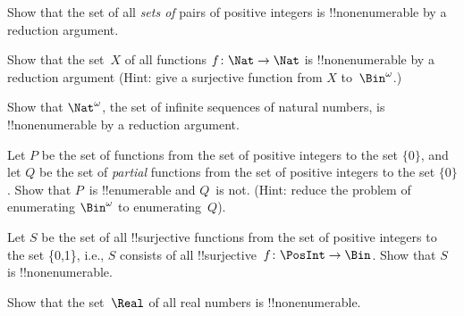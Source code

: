 \documentclass[../../../include/open-logic-section]{subfiles}
\begin{document}
\begin{prob}
Show that the set of all \emph{sets of} pairs of positive integers is
!!{nonenumerable} by a reduction argument.
\end{prob}

\begin{prob}\label{sfr:siz:red:prob:nat-nat}
  Show that the set~$X$ of all functions $f\colon \Nat \to \Nat$ is
  !!{nonenumerable} by a reduction argument (Hint: give a surjective
  function from $X$ to~$\Bin^\omega$.)
\end{prob}

\begin{prob}
Show that $\Nat^\omega$, the set of infinite sequences of
natural numbers, is !!{nonenumerable} by a reduction argument.
\end{prob}

\begin{prob}
Let $P$ be the set of functions from the set of positive
integers to the set $\{0\}$, and let $Q$ be the set of \emph{partial}
functions from the set of positive integers to the set $\{0\}$. Show
that $P$~is !!{enumerable} and $Q$~is not. (Hint: reduce the problem
of enumerating $\Bin^\omega$ to enumerating~$Q$).
\end{prob}

\begin{prob}
Let $S$ be the set of all !!{surjective} functions from the set of
positive integers to the set \{0,1\}, i.e., $S$ consists of all
!!{surjective}~$f\colon \PosInt \to \Bin$.  Show that $S$ is
!!{nonenumerable}.
\end{prob}

\begin{prob}
Show that the set~$\Real$ of all real numbers is !!{nonenumerable}.
\end{prob}
\end{document}
